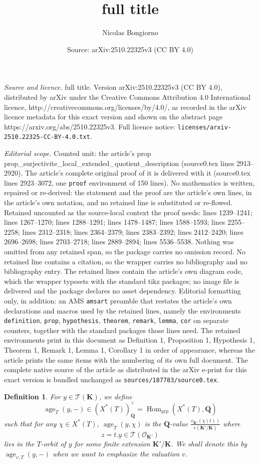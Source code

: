 \documentclass[10pt,a4paper]{amsart}
\title{full title}
\author{Nicolas Bongiorno}
\date{Source: arXiv:2510.22325v3 (CC BY 4.0)}
\newtheorem{definition}{Definition}
\DeclareMathOperator{\Hom}{Hom}
\newcommand{\K}{\mathbf{K}}
\newcommand{\Q}{\mathbf{Q}}
\DeclareMathOperator{\age}{age}
\DeclareMathOperator{\grp}{grp}
\newcommand{\sheafO}{\mathcal{O}}
\newcommand{\stackT}{\mathcal{T}}
\begin{document}
\maketitle

\noindent\emph{Source and licence.} full title. Version arXiv:2510.22325v3 (CC BY 4.0), distributed by arXiv under the Creative Commons Attribution 4.0 International licence, http://creativecommons.org/licenses/by/4.0/, as recorded in the arXiv licence metadata for this exact version and shown on the abstract page https://arxiv.org/abs/2510.22325v3. Full licence notice: \texttt{licenses/arxiv-2510.22325-CC-BY-4.0.txt}.\par\smallskip

\noindent\textit{Editorial scope.} Counted unit: the article's prop prop\_surjectivite\_local\_extended\_quotient\_description (source0.tex lines 2913--2920). The article's complete original proof of it is delivered with it (source0.tex lines 2923--3072, one \texttt{proof} environment of 150 lines). No mathematics is written, repaired or re-derived: the statement and the proof are the article's own lines, in the article's own notation, and no retained line is substituted or re-flowed.  Retained uncounted as the source-local context the proof needs: lines 1239--1241; lines 1267--1270; lines 1288--1291; lines 1478--1487; lines 1588--1593; lines 2255--2258; lines 2312--2318; lines 2364--2379; lines 2383--2392; lines 2412--2420; lines 2696--2698; lines 2703--2718; lines 2889--2894; lines 5536--5538.  Nothing was omitted from any retained span, so the package carries no omission record.  No retained line contains a citation, so the wrapper carries no bibliography and no bibliography entry.  The retained lines contain the article's own diagram code, which the wrapper typesets with the standard tikz packages; no image file is delivered and the package declares no asset dependency.  Editorial formatting only, in addition: an AMS \texttt{amsart} preamble that restates the article's own declarations and macros used by the retained lines, namely the environments \texttt{definition}, \texttt{prop}, \texttt{hypothesis}, \texttt{theorem}, \texttt{remark}, \texttt{lemma}, \texttt{cor} on separate counters, together with the standard packages those lines need.  The retained environments print in this document as Definition 1, Proposition 1, Hypothesis 1, Theorem 1, Remark 1, Lemma 1, Corollary 1 in order of appearance, whereas the article prints the same items with the numbering of its own full document.  The complete native source of the article as distributed in the arXiv e-print for this exact version is bundled unchanged as \texttt{sources/187783/source0.tex}.
\begin{definition}\label{def_age_univ_torsor}
   For $y \in \stackT(\K)$, we define $$\age_T(y,-) \in \left(X^*(T)\right)^{\vee}_{\Q} = \Hom_{\grp}(X^*(T),\Q)$$ such that for any $\chi \in X^*(T)$, $\age_T(y,\chi)$ is the $\Q$-value $\frac{v_{\K'}(\chi(t))}{e(\K' / \K)} $ where $$z = t.y \in \stackT(\sheafO_{\K'})$$ lies in the $T$-orbit of $y$ for some finite extension $\K' / \K$. We shall denote this by $\age_{v,T}(y,-)$ when we want to emphasize the valuation $v$.
\end{definition}
\end{document}
